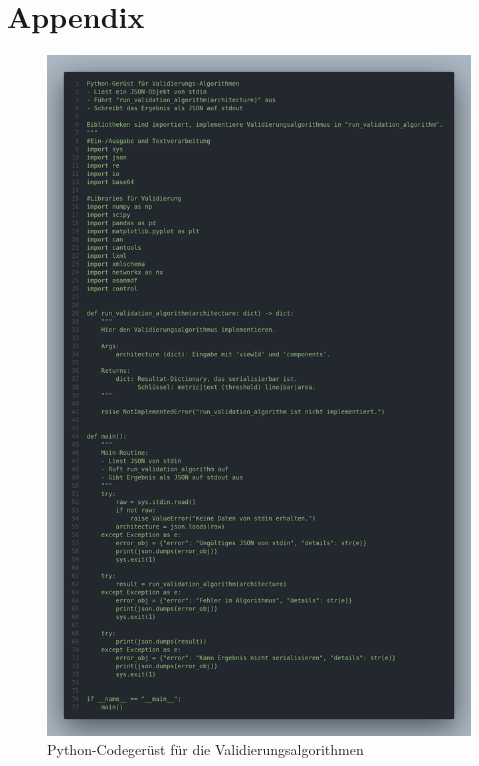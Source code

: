
\chapter{Appendix}

\begin{figure}[h!]
  \centering
  \includegraphics[height=\textheight]{figures/05Implementierung/code.png}
  \caption{Python-Codegerüst für die Validierungsalgorithmen}
  \label{fig:codeskeleton}
\end{figure}
